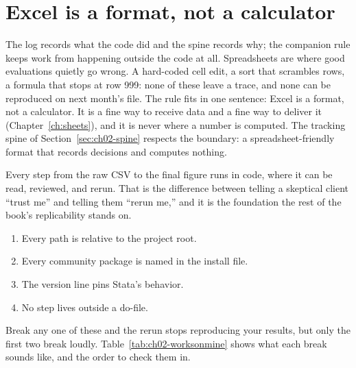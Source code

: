 \documentclass[
    a4paper,
    fontsize=10pt,
    twoside=true,
    numbers=noenddot,
]{kaobook}
\newenvironment{restson}[1][What this depends on]{%
    \begin{restsonbox}[frametitle={#1}]%
}{%
    \end{restsonbox}%
}
\begin{document}
\section{Excel is a format, not a calculator}\label{sec:ch02-excel}
The log records what the code did and the spine records why; the companion rule keeps work from happening outside the code at all. Spreadsheets are where good evaluations quietly go wrong. A hard-coded cell edit, a sort that scrambles rows, a formula that stops at row 999: none of these leave a trace, and none can be reproduced on next month's file. The rule fits in one sentence: Excel is a format, not a calculator. It is a fine way to receive data and a fine way to deliver it (Chapter~\ref{ch:sheets}), and it is never where a number is computed. The tracking spine of Section~\ref{sec:ch02-spine} respects the boundary: a spreadsheet-friendly format that records decisions and computes nothing.

Every step from the raw CSV to the final figure runs in code, where it can be read, reviewed, and rerun. That is the difference between telling a skeptical client \enquote{trust me} and telling them \enquote{rerun me,} and it is the foundation the rest of the book's replicability stands on.

\begin{restson}[What a clean rerun depends on]
\begin{enumerate}
\item Every path is relative to the project root.
\item Every community package is named in the install file.
\item The version line pins Stata's behavior.
\item No step lives outside a do-file.
\end{enumerate}
Break any one of these and the rerun stops reproducing your results, but only the first two break loudly. Table~\ref{tab:ch02-worksonmine} shows what each break sounds like, and the order to check them in.
\end{restson}
\end{document}
